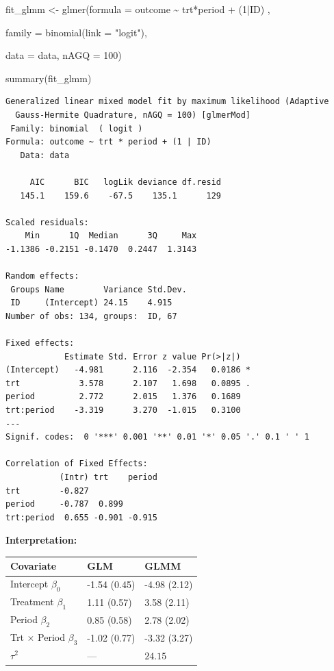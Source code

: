 \documentclass[
  letterpaper,
  DIV=11,
  numbers=noendperiod]{scrreprt}
\newenvironment{Shaded}{\begin{snugshade}}{\end{snugshade}}
\newcommand{\AttributeTok}[1]{\textcolor[rgb]{0.40,0.45,0.13}{#1}}
\newcommand{\DecValTok}[1]{\textcolor[rgb]{0.68,0.00,0.00}{#1}}
\newcommand{\FunctionTok}[1]{\textcolor[rgb]{0.28,0.35,0.67}{#1}}
\newcommand{\NormalTok}[1]{\textcolor[rgb]{0.00,0.23,0.31}{#1}}
\newcommand{\OtherTok}[1]{\textcolor[rgb]{0.00,0.23,0.31}{#1}}
\newcommand{\SpecialCharTok}[1]{\textcolor[rgb]{0.37,0.37,0.37}{#1}}
\newcommand{\StringTok}[1]{\textcolor[rgb]{0.13,0.47,0.30}{#1}}
\begin{document}
\begin{Shaded}
\begin{Highlighting}[]
\NormalTok{fit\_glmm }\OtherTok{\textless{}{-}} \FunctionTok{glmer}\NormalTok{(}\AttributeTok{formula =}\NormalTok{ outcome }\SpecialCharTok{\textasciitilde{}}\NormalTok{ trt}\SpecialCharTok{*}\NormalTok{period }\SpecialCharTok{+}\NormalTok{ (}\DecValTok{1}\SpecialCharTok{|}\NormalTok{ID) ,}

    \AttributeTok{family =} \FunctionTok{binomial}\NormalTok{(}\AttributeTok{link =} \StringTok{"logit"}\NormalTok{),}

    \AttributeTok{data =}\NormalTok{ data, }\AttributeTok{nAGQ =} \DecValTok{100}\NormalTok{)}

\FunctionTok{summary}\NormalTok{(fit\_glmm)}
\end{Highlighting}
\end{Shaded}

\begin{verbatim}
Generalized linear mixed model fit by maximum likelihood (Adaptive
  Gauss-Hermite Quadrature, nAGQ = 100) [glmerMod]
 Family: binomial  ( logit )
Formula: outcome ~ trt * period + (1 | ID)
   Data: data

     AIC      BIC   logLik deviance df.resid 
   145.1    159.6    -67.5    135.1      129 

Scaled residuals: 
    Min      1Q  Median      3Q     Max 
-1.1386 -0.2151 -0.1470  0.2447  1.3143 

Random effects:
 Groups Name        Variance Std.Dev.
 ID     (Intercept) 24.15    4.915   
Number of obs: 134, groups:  ID, 67

Fixed effects:
            Estimate Std. Error z value Pr(>|z|)  
(Intercept)   -4.981      2.116  -2.354   0.0186 *
trt            3.578      2.107   1.698   0.0895 .
period         2.772      2.015   1.376   0.1689  
trt:period    -3.319      3.270  -1.015   0.3100  
---
Signif. codes:  0 '***' 0.001 '**' 0.01 '*' 0.05 '.' 0.1 ' ' 1

Correlation of Fixed Effects:
           (Intr) trt    period
trt        -0.827              
period     -0.787  0.899       
trt:period  0.655 -0.901 -0.915
\end{verbatim}

\textbf{Interpretation:}

\begin{longtable}[]{@{}lll@{}}
\toprule\noalign{}
Covariate & GLM & GLMM \\
\midrule\noalign{}
\endhead
\bottomrule\noalign{}
\endlastfoot
Intercept \(\beta_0\) & -1.54 (0.45) & -4.98 (2.12) \\
Treatment \(\beta_1\) & 1.11 (0.57) & 3.58 (2.11) \\
Period \(\beta_2\) & 0.85 (0.58) & 2.78 (2.02) \\
Trt \(\times\) Period \(\beta_3\) & -1.02 (0.77) & -3.32 (3.27) \\
\(\tau^2\) & --- & \(24.15\) \\
\end{longtable}
\end{document}
